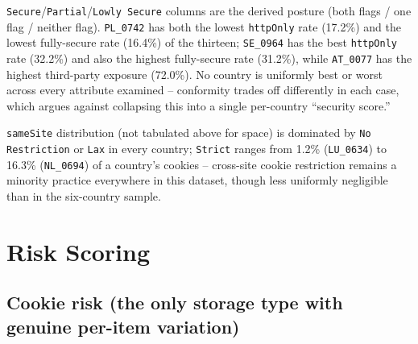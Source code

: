 \documentclass[11pt,a4paper]{article}
\newcommand{\code}[1]{\texttt{#1}}
\begin{document}
\code{Secure}/\code{Partial}/\code{Lowly Secure} columns are the derived
posture (both flags / one flag / neither flag). \code{PL\_0742} has both the
lowest \code{httpOnly} rate (17.2\%) and the lowest fully-secure rate
(16.4\%) of the thirteen; \code{SE\_0964} has the best \code{httpOnly}
rate (32.2\%) and also the highest fully-secure rate (31.2\%), while
\code{AT\_0077} has the highest third-party exposure (72.0\%). No
country is uniformly best or worst across every attribute examined --
conformity trades off differently in each case, which argues against
collapsing this into a single per-country ``security score.''

\code{sameSite} distribution (not tabulated above for space) is dominated by
\code{No Restriction} or \code{Lax} in every country; \code{Strict} ranges from
1.2\% (\code{LU\_0634}) to 16.3\% (\code{NL\_0694}) of a
country's cookies -- cross-site cookie restriction remains a minority practice
everywhere in this dataset, though less uniformly negligible than in the
six-country sample.

\section{Risk Scoring}

\subsection{Cookie risk (the only storage type with genuine per-item variation)}
\end{document}
